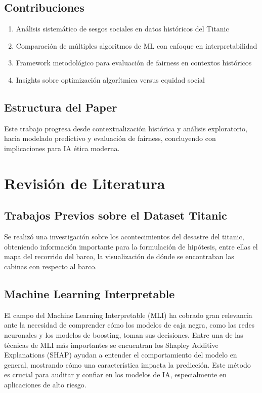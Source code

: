 \documentclass[conference]{IEEEtran}
\begin{document}
\subsection{Contribuciones}
\begin{enumerate}
    \item Análisis sistemático de sesgos sociales en datos históricos del Titanic
    \item Comparación de múltiples algoritmos de ML con enfoque en interpretabilidad
    \item Framework metodológico para evaluación de fairness en contextos históricos
    \item Insights sobre optimización algorítmica versus equidad social
\end{enumerate}

\subsection{Estructura del Paper}
Este trabajo progresa desde contextualización histórica y análisis exploratorio, hacia modelado predictivo y evaluación de fairness, concluyendo con implicaciones para IA ética moderna.

\section{Revisión de Literatura}
\subsection{Trabajos Previos sobre el Dataset Titanic}
Se realizó una investigación sobre los acontecimientos del desastre del titanic, obteniendo información importante para la formulación de hipótesis, entre ellas el mapa del recorrido del barco, la visualización de dónde se encontraban las cabinas con respecto al barco. 
\subsection{Machine Learning Interpretable}
El campo del Machine Learning Interpretable (MLI) ha cobrado gran relevancia ante la necesidad de comprender cómo los modelos de caja negra, como las redes neuronales y los modelos de boosting, toman sus decisiones. Entre una de las técnicas de MLI más importantes se encuentran los Shapley Additive Explanations (SHAP) ayudan a entender el comportamiento del modelo en general, mostrando cómo una característica impacta la predicción. Este método es crucial para auditar y confiar en los modelos de IA, especialmente en aplicaciones de alto riesgo.
\end{document}
